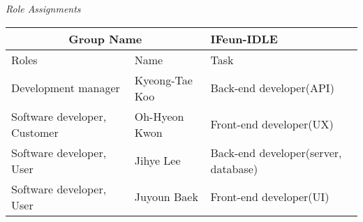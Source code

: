 \documentclass[twocolumn, letterpaper]{scrartcl}
\begin{document}
    \begin{center}
    \textit{Role Assignments}
    \begin{tabular}{|p{2cm}|p{2cm}|p{2cm}|}
    \hline
    \multicolumn{2}{|c|}{Group Name} & IFeun-IDLE \\
    \hline
      Roles & Name & Task\\
    \hline
      Development manager & Kyeong-Tae Koo & Back-end developer(API) \\
    \hline
      Software developer, Customer & Oh-Hyeon Kwon & Front-end developer(UX)\\
    \hline
      Software developer, User & Jihye Lee & Back-end developer(server, database)\\
    \hline
      Software developer, User & Juyoun Baek & Front-end developer(UI)\\
    \hline
    \end{tabular}
    \end{center}
\newpage
\end{document}
